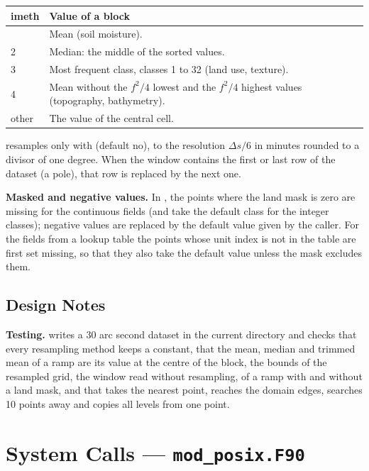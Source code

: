 \begin{longtable}{L{1.2cm} L{12.8cm}}
  \toprule
  \textbf{imeth} & \textbf{Value of a block} \\
  \midrule
  \endhead
  \bottomrule
   & Mean (soil moisture). \\
  2 & Median: the middle of the sorted values. \\
  3 & Most frequent class, classes 1 to 32 (land use, texture). \\
  4 & Mean without the $f^2/4$ lowest and the $f^2/4$ highest values
      (topography, bathymetry). \\
  other & The value of the central cell. \\
\end{longtable}

\noindent {} resamples only with  (default no),
to the resolution $\Delta s/6$ in minutes rounded to a divisor of one
degree. When the window contains the first or last row of the dataset (a
pole), that row is replaced by the next one.

\textbf{Masked and negative values.} In , the points where the
land mask is zero are missing for the continuous fields (and take the
default class for the integer classes); negative values are replaced by the
default value given by the caller. For the fields from a lookup table the
points whose unit index is not in the table are first set missing, so that
they also take the default value unless the mask excludes them.

\subsection{Design Notes}

\textbf{Testing.}  writes a 30 arc
second dataset in the current directory and checks that every resampling
method keeps a constant, that the mean, median and trimmed mean of a ramp
are its value at the centre of the block, the bounds of the resampled grid,
the window read without resampling,  of a ramp with and
without a land mask, and that  takes the nearest point,
reaches the domain edges, searches 10 points away and copies all levels
from one point.

\section{System Calls --- \texttt{mod\_posix.F90}}
\label{sec:posix}

